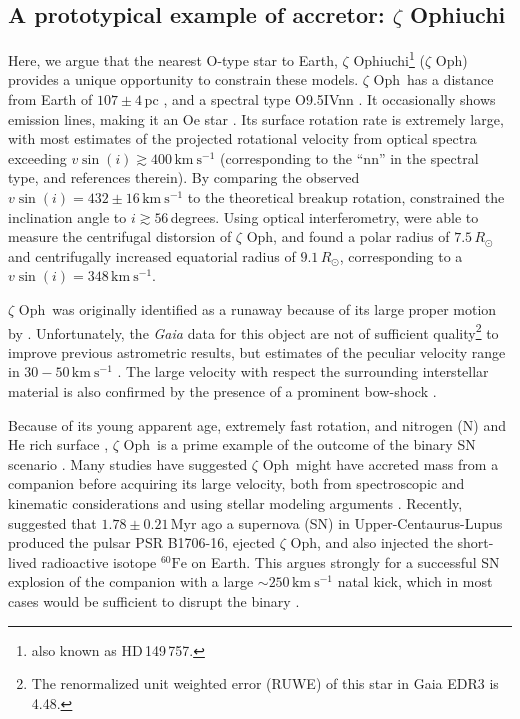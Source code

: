 \documentclass[twocolumn,twocolappendix,trackchanges]{aastex63}
\newcommand{\kms}{{\mathrm{km\ s^{-1}}}}
\newcommand{\zoph}{$\zeta$ Oph}
\begin{document}
\subsection{A prototypical example of accretor: $\zeta$ Ophiuchi}

Here, we argue that the nearest O-type star to Earth, $\zeta$
Ophiuchi\footnote{also known as HD\,149\,757.} (\zoph) provides a
unique opportunity to constrain these models.  \zoph\ has a distance
from Earth of $107\pm4$\,pc \citep[][and references
therein]{neuhauser:20}, and a spectral type O9.5{\rm IVnn}
\citep{sota:14}. It occasionally shows emission lines, making it an Oe
star \citep{walker:79, vink:09}. Its surface rotation rate is
extremely large, with most estimates of the projected rotational
velocity from optical spectra exceeding $v\sin(i)\gtrsim 400\,\kms$
(corresponding to the ``nn'' in the spectral type, \citealt{zehe:18}
and references therein). By comparing the
observed $v\sin(i)=432\pm16\,\kms$ to the theoretical breakup
rotation, \cite{zehe:18} constrained the inclination angle to
$i\gtrsim 56$\,degrees. Using optical interferometry, \cite{gordon:18}
were able to measure the centrifugal distorsion of \zoph, and found a
polar radius of $7.5\,R_\odot$ and centrifugally increased equatorial
radius of $9.1\,R_\odot$, corresponding to a $v\sin(i)=348\,\kms$.

\zoph\ was originally
identified as a runaway because of its large proper motion by
\cite{blaauw:52}. Unfortunately, the \emph{Gaia} data for this object
are not of sufficient quality\footnote{The renormalized unit weighted
  error (RUWE) of this star in Gaia EDR3 is 4.48.} to improve previous astrometric results,
but estimates of the peculiar velocity range in $30-50\,\kms$
\citep[e.g.,][]{zehe:18, neuhauser:20}. The large velocity with
respect the surrounding interstellar material is also confirmed by the
presence of a prominent bow-shock \citep[e.g.,][]{bodensteiner:18}.

Because of its young apparent age, extremely fast rotation, and nitrogen
(N) and He rich surface \citep[e.g.,][]{herrero:92, blaauw:93,
  villamariz:05, marcolino:09}, \zoph\ is a prime example of the
outcome of the binary SN scenario \citep{blaauw:93}. Many studies have suggested
\zoph\ might have accreted mass from a companion before acquiring its
large velocity, both from spectroscopic and kinematic considerations
\citep[e.g.,][]{blaauw:93, hoogerwerf:00, hoogerwerf:01, tetzlaff:10,
  neuhauser:20} and using stellar modeling arguments
\citep[e.g.,][]{vanrensbergen:96}. Recently, \cite{neuhauser:20}
suggested that $1.78\pm0.21$\,Myr ago a supernova (SN) in
Upper-Centaurus-Lupus produced the pulsar PSR B1706-16, ejected \zoph,
and also injected the short-lived radioactive isotope
$^{60}\mathrm{Fe}$ on Earth. This argues strongly for a successful
SN explosion of the companion with a large $\sim 250\,\kms$ natal
kick, which in most cases would be sufficient to disrupt the binary
\citep[e.g.,][]{tauris:15, renzo:19walk, evans:20}.
\end{document}
